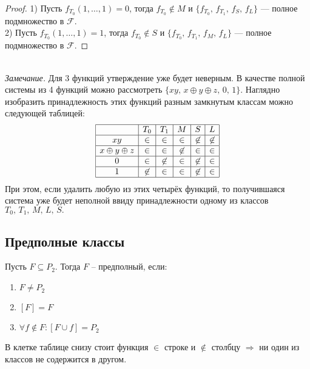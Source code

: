 \begin{proof}
1) Пусть $f_{T_0}(1,\ldots,1) = 0$, тогда $f_{T_0} \not \in M$ и $\{f_{T_0},\, f_{T_1},\, f_S,\,f_L \}$ --- полное подмножество в $\mathcal{F}$.\\
2) Пусть $f_{T_0}(1,\ldots,1) = 1$, тогда $f_{T_0} \not \in S$ и $\{f_{T_0},\, f_{T_1},\, f_M,\,f_L \}$ --- полное подмножество в $\mathcal{F}$.
\end{proof}
~\\
\textit{Замечание.} Для 3 функций утверждение уже будет неверным. В качестве полной системы из 4 функций можно рассмотреть  $\{xy,\, x\oplus y\oplus z, \, 0,\, 1 \}$. Наглядно изобразить принадлежность этих функций разным замкнутым классам можно следующей таблицей:
$$
\begin{array}{|c|c|c|c|c|c|}
\hline
    &      T_0       &       T_1      &      M      &      S      &      L \\
\hline
xy  &      \in       &       \in      &      \in    &   \not\in   &    \not\in \\
\hline 
x\oplus y\oplus z & \in &    \in      &     \not\in &   \in       &    \in \\
\hline
0   &      \in       &     \not\in    &      \in    &   \not\in   &    \in \\
\hline
1   &      \not\in   &     \in        &      \in    &   \not\in   &    \in \\
\hline
\end{array}
$$
При этом, если удалить любую из этих четырёх функций, то получившаяся система уже будет неполной ввиду принадлежности одному из классов $ T_0,\, T_1,\,M,\,L,\,S.$

\subsection{Предполные классы}

\begin{df}
	Пусть $F \subseteq P_2$. Тогда $F$ -- предполный, если: 
	\begin{enumerate}
		\item $F \ne P_2$
		\item $[F] = F$
		\item $\forall f \notin F: [F \cup {f}] = P_2$
	\end{enumerate}
\end{df}

В клетке таблице снизу стоит функция $\in$ строке и $\not \in $ столбцу $\Rightarrow$ ни один из классов не содержится в другом.

